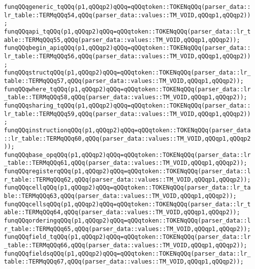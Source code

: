 \verb|funqQQqgeneric_tqQQq(p1,qQQqp2)qQQq=qQQqtoken::TOKENqQQq(parser_data::lr_table::TERMqQQq54,qQQq(parser_data::values::TM_VOID,qQQqp1,qQQqp2));|\newline
\verb|funqQQqapi_tqQQq(p1,qQQqp2)qQQq=qQQqtoken::TOKENqQQq(parser_data::lr_table::TERMqQQq55,qQQq(parser_data::values::TM_VOID,qQQqp1,qQQqp2));|\newline
\verb|funqQQqbegin_apiqQQq(p1,qQQqp2)qQQq=qQQqtoken::TOKENqQQq(parser_data::lr_table::TERMqQQq56,qQQq(parser_data::values::TM_VOID,qQQqp1,qQQqp2));|\newline
\verb|funqQQqstructqQQq(p1,qQQqp2)qQQq=qQQqtoken::TOKENqQQq(parser_data::lr_table::TERMqQQq57,qQQq(parser_data::values::TM_VOID,qQQqp1,qQQqp2));|\newline
\verb|funqQQqwhere_tqQQq(p1,qQQqp2)qQQq=qQQqtoken::TOKENqQQq(parser_data::lr_table::TERMqQQq58,qQQq(parser_data::values::TM_VOID,qQQqp1,qQQqp2));|\newline
\verb|funqQQqsharing_tqQQq(p1,qQQqp2)qQQq=qQQqtoken::TOKENqQQq(parser_data::lr_table::TERMqQQq59,qQQq(parser_data::values::TM_VOID,qQQqp1,qQQqp2));|\newline
\verb|funqQQqinstructionqQQq(p1,qQQqp2)qQQq=qQQqtoken::TOKENqQQq(parser_data::lr_table::TERMqQQq60,qQQq(parser_data::values::TM_VOID,qQQqp1,qQQqp2));|\newline
\verb|funqQQqbase_opqQQq(p1,qQQqp2)qQQq=qQQqtoken::TOKENqQQq(parser_data::lr_table::TERMqQQq61,qQQq(parser_data::values::TM_VOID,qQQqp1,qQQqp2));|\newline
\verb|funqQQqregisterqQQq(p1,qQQqp2)qQQq=qQQqtoken::TOKENqQQq(parser_data::lr_table::TERMqQQq62,qQQq(parser_data::values::TM_VOID,qQQqp1,qQQqp2));|\newline
\verb|funqQQqcellqQQq(p1,qQQqp2)qQQq=qQQqtoken::TOKENqQQq(parser_data::lr_table::TERMqQQq63,qQQq(parser_data::values::TM_VOID,qQQqp1,qQQqp2));|\newline
\verb|funqQQqcellsqQQq(p1,qQQqp2)qQQq=qQQqtoken::TOKENqQQq(parser_data::lr_table::TERMqQQq64,qQQq(parser_data::values::TM_VOID,qQQqp1,qQQqp2));|\newline
\verb|funqQQqorderingqQQq(p1,qQQqp2)qQQq=qQQqtoken::TOKENqQQq(parser_data::lr_table::TERMqQQq65,qQQq(parser_data::values::TM_VOID,qQQqp1,qQQqp2));|\newline
\verb|funqQQqfield_tqQQq(p1,qQQqp2)qQQq=qQQqtoken::TOKENqQQq(parser_data::lr_table::TERMqQQq66,qQQq(parser_data::values::TM_VOID,qQQqp1,qQQqp2));|\newline
\verb|funqQQqfieldsqQQq(p1,qQQqp2)qQQq=qQQqtoken::TOKENqQQq(parser_data::lr_table::TERMqQQq67,qQQq(parser_data::values::TM_VOID,qQQqp1,qQQqp2));|\newline
